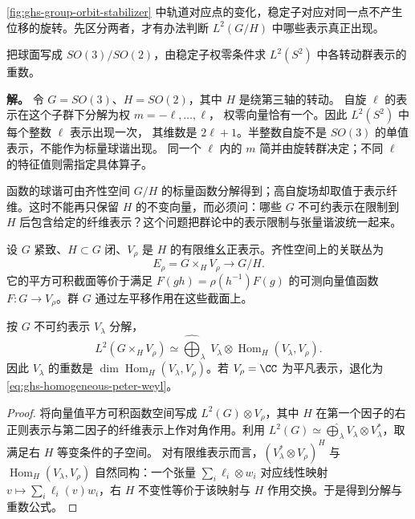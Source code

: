 \cref{fig:ghs-group-orbit-stabilizer} 中轨道对应点的变化，稳定子对应对同一点不产生位移的旋转。先区分两者，才有办法判断 $L^2(G/H)$ 中哪些表示真正出现。


\begin{example}[球谐的表示重数]
把球面写成 $SO(3)/SO(2)$，由稳定子权零条件求 $L^2(S^2)$ 中各转动群表示的重数。

\textbf{解。} 令 $G=SO(3)$、$H=SO(2)$，其中 $H$ 是绕第三轴的转动。
自旋 $\ell$ 的表示在这个子群下分解为权 $m=-\ell,\ldots,\ell$，
权零向量恰有一个。因此 $L^2(S^2)$ 中每个整数 $\ell$ 表示出现一次，
其维数是 $2\ell+1$。半整数自旋不是 $SO(3)$ 的单值表示，不能作为标量球谐出现。
同一个 $\ell$ 内的 $m$ 简并由旋转群决定；不同 $\ell$ 的特征值则需指定具体算子。
\end{example}

函数的球谐可由齐性空间 $G/H$ 的标量函数分解得到；高自旋场却取值于表示纤维。这时不能再只保留 $H$ 的不变向量，而必须问：哪些 $G$ 不可约表示在限制到 $H$ 后包含给定的纤维表示？这个问题把群论中的表示限制与张量谐波统一起来。


\begin{definition}[关联丛与等变截面]
设 $G$ 紧致、$H\subset G$ 闭、$V_\rho$ 是 $H$ 的有限维幺正表示。齐性空间上的关联丛为
\[
 E_\rho=G\times_HV_\rho\longrightarrow G/H.
\]
它的平方可积截面等价于满足 $F(gh)=\rho(h^{-1})F(g)$ 的可测向量值函数 $F:G\to V_\rho$。群 $G$ 通过左平移作用在这些截面上。
\end{definition}

\begin{theorem}[张量截面的表示重数]
\label{thm:ghs-induced-bundle-decomp}
按 $G$ 不可约表示 $V_\lambda$ 分解，
\begin{equation}\label{eq:ghs-vectorbundle-peter-weyl}
 L^2(G\times_HV_\rho)\simeq
 \widehat{\bigoplus}_{\lambda}\;
 V_\lambda\otimes\operatorname{Hom}_H(V_\lambda,V_\rho).
\end{equation}
因此 $V_\lambda$ 的重数是 $\dim\operatorname{Hom}_H(V_\lambda,V_\rho)$。若 $V_\rho=\CC$ 为平凡表示，退化为 \cref{eq:ghs-homogeneous-peter-weyl}。
\end{theorem}
\begin{proof}
将向量值平方可积函数空间写成 $L^2(G)\otimes V_\rho$，其中 $H$ 在第一个因子的右正则表示与第二因子的纤维表示上作对角作用。利用
$L^2(G)\simeq\widehat\bigoplus_\lambda V_\lambda\otimes V_\lambda^*$，取满足右 $H$ 等变条件的子空间。
对有限维表示而言，$(V_\lambda^*\otimes V_\rho)^H$ 与 $\operatorname{Hom}_H(V_\lambda,V_\rho)$ 自然同构：一个张量 $\sum_i\ell_i\otimes w_i$ 对应线性映射 $v\mapsto\sum_i\ell_i(v)w_i$，右 $H$ 不变性等价于该映射与 $H$ 作用交换。于是得到分解与重数公式。
\end{proof}

